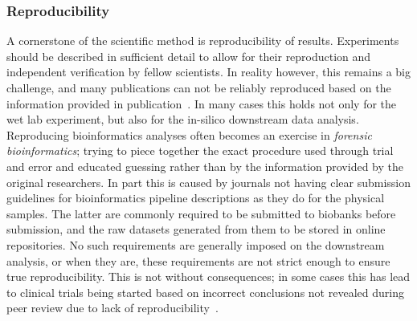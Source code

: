 \begin{justify}
\subsubsection{Reproducibility}

A cornerstone of the scientific method is reproducibility of results. Experiments should be described in sufficient detail to allow for their reproduction and independent verification by fellow scientists. In reality however, this remains a big challenge, and many publications can not be reliably reproduced based on the information provided in publication~\cite{baggerly2009reproducible,kim2018reproducibility}. In many cases this holds not only for the wet lab experiment, but also for the in-silico downstream data analysis. Reproducing bioinformatics analyses often becomes an exercise in \textit{forensic bioinformatics}; trying to piece together the exact procedure used through trial and error and educated guessing rather than by the information provided by the original researchers. In part this is caused by journals not having clear submission guidelines for bioinformatics pipeline descriptions as they do for the physical samples. The latter are commonly required to be submitted to biobanks before submission, and the raw datasets generated from them to be stored in online repositories. No such requirements are generally imposed on the downstream analysis, or when they are, these requirements are not strict enough to ensure true reproducibility. This is not without consequences; in some cases this has lead to clinical trials being started based on incorrect conclusions not revealed during peer review due to lack of reproducibility~\cite{baggerly2009reproducible}.

\end{justify}
